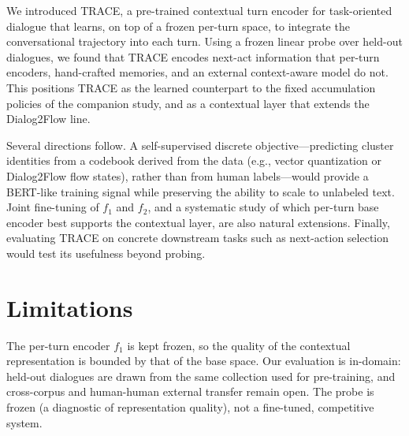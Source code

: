 \documentclass[11pt]{article}
\begin{document}
We introduced TRACE, a pre-trained contextual turn encoder for task-oriented dialogue that learns,
on top of a frozen per-turn space, to integrate the conversational trajectory into each turn. Using a
frozen linear probe over held-out dialogues, we found that TRACE encodes next-act information that
per-turn encoders, hand-crafted memories, and an external context-aware model do not. This positions
TRACE as the learned counterpart to the fixed accumulation policies of the companion study, and as a
contextual layer that extends the Dialog2Flow line.

Several directions follow. A self-supervised discrete objective---predicting cluster identities from a
codebook derived from the data (e.g., vector quantization or Dialog2Flow flow states), rather than
from human labels---would provide a BERT-like training signal while preserving the ability to scale
to unlabeled text. Joint fine-tuning of $f_1$ and $f_2$, and a systematic study of which per-turn base
encoder best supports the contextual layer, are also natural extensions. Finally, evaluating TRACE on
concrete downstream tasks such as next-action selection would test its usefulness beyond probing.

\section*{Limitations}
The per-turn encoder $f_1$ is kept frozen, so the quality of the contextual representation is bounded
by that of the base space. Our evaluation is in-domain: held-out dialogues are drawn from the same
collection used for pre-training, and cross-corpus and human-human external transfer remain open.
The probe is frozen (a diagnostic of representation quality), not a fine-tuned, competitive system.

\nocite{*}  %

\end{document}
